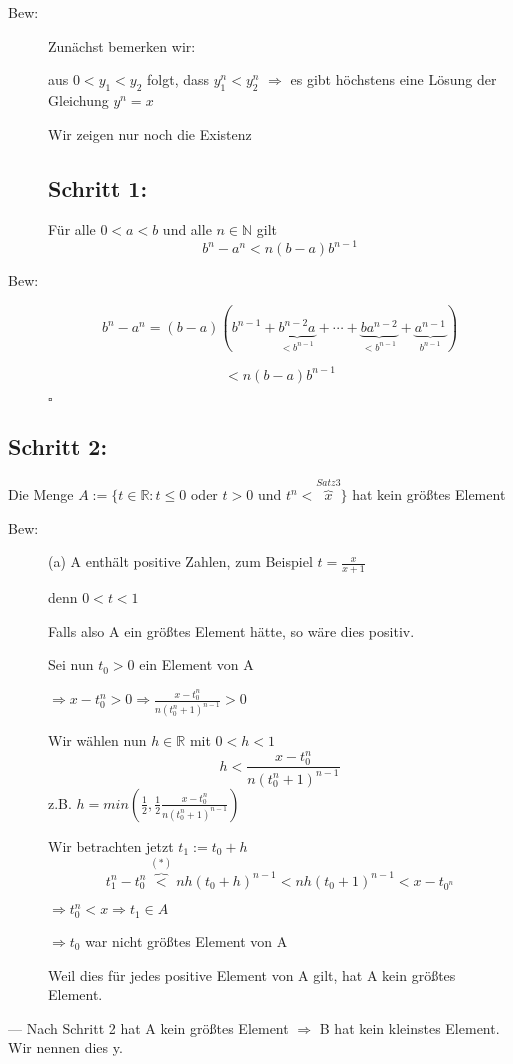 \documentclass[12pt,a4paper]{article}
\begin{document}
\begin{description}
\item[Bew:] Zunächst bemerken wir:

aus $0<y_{1}<y_{2}$ folgt, dass $y_{1}^{n}<y_{2}^{n}$
$\Rightarrow$ es gibt höchstens eine Lösung der Gleichung $y^{n}=x$

Wir zeigen nur noch die Existenz
\subsection*{Schritt 1:} Für alle $0<a<b$ und alle $n \in \mathbb{N}$ gilt
\renewcommand{\theequation}{*}
\begin{equation}
b^{n}-a^{n}<n(b-a)b^{n-1}
\end{equation}
\end{description}
\begin{description}
\item[Bew:] $$b^{n}-a^{n}=(b-a)(b^{n-1}+\underbrace{b^{n-2}a}_{<b^{n-1}}+\cdots+\underbrace{ba^{n-2}}_{<b^{n-1}}+\underbrace{a^{n-1}}_{b^{n-1}})$$ 

$$<n(b-a)b^{n-1}$$
\begin{flushright} $ \square $ \end{flushright}
\end{description}
\subsection*{Schritt 2:} Die Menge
$A:=\lbrace t\in \mathbb{R}:t\leq0 $ oder $ t>0 $ und $t^{n}<\overbrace{x}^{Satz 3}\rbrace$
hat kein größtes Element
\begin{description}
\item[Bew:] (a) A enthält positive Zahlen, zum Beispiel $t=\frac{x}{x+1}$

denn $0<t<1$ 

Falls also A ein größtes Element hätte, so wäre dies positiv.

Sei nun $t_{0}>0$ ein Element von A 

$\Rightarrow x-t_{0}^{n}>0 \Rightarrow \frac{x-t_{0}^{n}}{n(t_{0}^{n}+1)^{n-1}}>0$  

Wir wählen nun $h \in\mathbb{R}$ mit $0<h<1$
$$ h<\frac{x-t_{0}^{n}}{n(t_0^n+1)^{n-1}}$$
z.B. $h=min(\frac{1}{2},\frac{1}{2} \frac{x-t_{0}^{n}}{n(t_{0}^{n}+1)^{n-1}} )$

Wir betrachten jetzt $t_{1}:=t_{0}+h$
$$ t_{1}^{n}-t_{0}^{n}\overbrace{<}^{(*)}n h (t_{0}+h)^{n-1}<n h (t_{0}+1)^{n-1}<x-t_{0^{n}}$$

$\Rightarrow t_{0}^{n}<x \Rightarrow t_{1} \in A$

$\Rightarrow t_{0}$ war nicht größtes Element von A

Weil dies für jedes positive Element von A gilt, hat A kein größtes Element. 
\end{description}
---
Nach Schritt 2 hat A kein größtes Element $\Rightarrow$ B hat  kein kleinstes Element. Wir nennen dies y.
\end{document}
